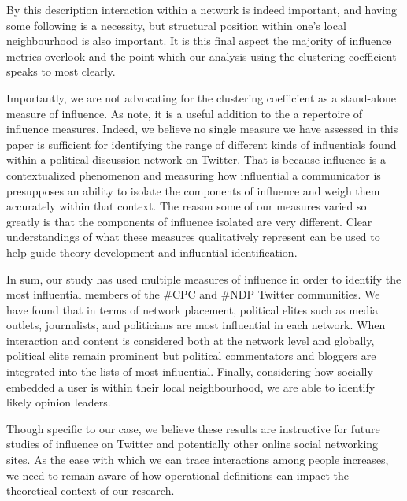 \documentclass[a4paper,12pt]{article}
\begin{document}
By this description interaction within a network is indeed important, and having some following is a necessity, but structural position within one's local neighbourhood is also important. It is this final aspect the majority of influence metrics overlook and the point which our analysis using the clustering coefficient speaks to most clearly.

Importantly, we are not advocating for the clustering coefficient as a stand-alone measure of influence. As \cite{GonzalezBailonBorgeHolthoeferMoreno2012} note, it is a useful addition to the a repertoire of influence measures. Indeed, we believe no single measure we have assessed in this paper is sufficient for identifying the range of different kinds of influentials found within a political discussion network on Twitter. That is because influence is a contextualized phenomenon and measuring how influential a communicator is presupposes an ability to isolate the components of influence and weigh them accurately within that context. The reason some of our measures varied so greatly is that the components of influence isolated are very different. Clear understandings of what these measures qualitatively represent can be used to help guide theory development and influential identification.

In sum, our study has used multiple measures of influence in order to identify the most influential members of the \#CPC and \#NDP Twitter communities. We have found that in terms of network placement, political elites such as media outlets, journalists, and politicians are most influential in each network. When interaction and content is considered both at the network level and globally, political elite remain prominent but political commentators and bloggers are integrated into the lists of most influential. Finally, considering how socially embedded a user is within their local neighbourhood, we are able to identify likely opinion leaders. 

Though specific to our case, we believe these results are instructive for future studies of influence on Twitter and potentially other online social networking sites. As the ease with which we can trace interactions among people increases, we need to remain aware of how operational definitions can impact the theoretical context of our research.
\clearpage 
\end{document}
